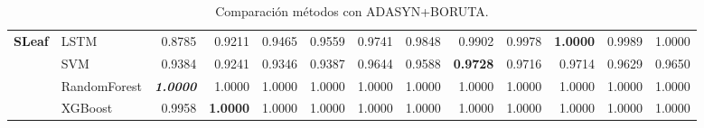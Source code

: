 \begin{table}[H]
\begin{adjustbox}{max width=14cm}
\begin{tabular}{|c|l|r|r|r|r|r|r|r|r|r|r|r|}
			\hline
			\textbf{SLeaf}        & LSTM         & 0.8785                   & 0.9211 & 0.9465          & 0.9559 & 0.9741          & 0.9848 & 0.9902          & 0.9978                   & \textbf{1.0000} & 0.9989          & 1.0000 \\
			                      & SVM          & 0.9384                   & 0.9241 & 0.9346          & 0.9387 & 0.9644          & 0.9588 & \textbf{0.9728}          & 0.9716                   & 0.9714                   & 0.9629          & 0.9650 \\
			                      & RandomForest & \textit{\textbf{1.0000}}          & 1.0000 & 1.0000          & 1.0000 & 1.0000          & 1.0000 & 1.0000          & 1.0000                   & 1.0000                   & 1.0000          & 1.0000 \\
			                      & XGBoost      & 0.9958                   & \textbf{1.0000} & 1.0000          & 1.0000 & 1.0000          & 1.0000 & 1.0000          & 1.0000                   & 1.0000                   & 1.0000          & 1.0000 \\
			\hline
		\end{tabular}
	\end{adjustbox}
	\caption{Comparación métodos con ADASYN+BORUTA.}
	\label{tab:all_comp_adasyn_boruta}
\end{table}



